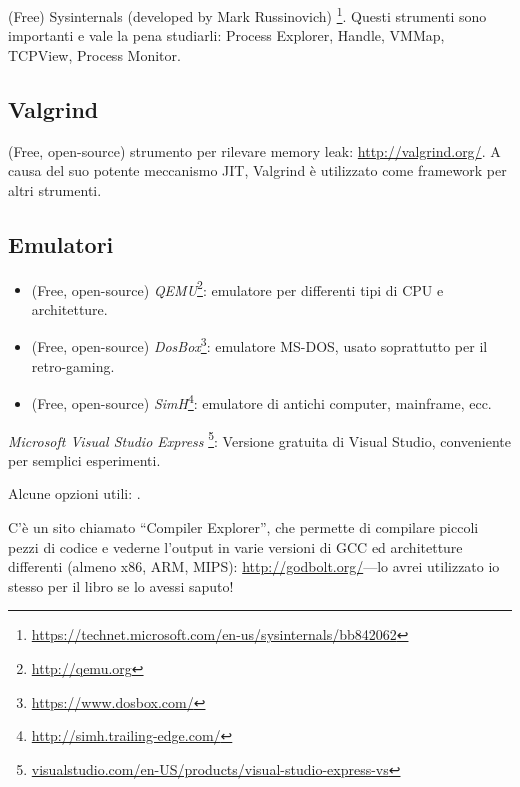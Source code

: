 (Free) Sysinternals (developed by Mark Russinovich)
\footnote{\url{https://technet.microsoft.com/en-us/sysinternals/bb842062}}.
Questi strumenti sono importanti e vale la pena studiarli: Process Explorer, Handle, VMMap, TCPView, Process Monitor.

\subsection{Valgrind}

(Free, open-source) strumento per rilevare memory leak: \url{http://valgrind.org/}.
A causa del suo potente meccanismo \ac{JIT}, Valgrind è utilizzato come framework per altri strumenti.


\subsection{Emulatori}

\begin{itemize}
\item (Free, open-source) \emph{QEMU}\footnote{\url{http://qemu.org}}: emulatore per differenti tipi di CPU e architetture.

\item (Free, open-source) \emph{DosBox}\footnote{\url{https://www.dosbox.com/}}: emulatore MS-DOS, usato soprattutto per il retro-gaming.

\item (Free, open-source) \emph{SimH}\footnote{\url{http://simh.trailing-edge.com/}}: emulatore di antichi computer, mainframe, ecc.
\end{itemize}


\emph{Microsoft Visual Studio Express}
\footnote{\href{http://go.yurichev.com/17034}{visualstudio.com/en-US/products/visual-studio-express-vs}}:
Versione gratuita di Visual Studio, conveniente per semplici esperimenti.

Alcune opzioni utili: .

C'è un sito chiamato ``Compiler Explorer'', che permette di compilare piccoli pezzi di codice e vederne l'output
in varie versioni di GCC ed architetture differenti
(almeno x86, ARM, MIPS): \url{http://godbolt.org/}---lo avrei utilizzato io stesso per il libro se lo avessi saputo!


